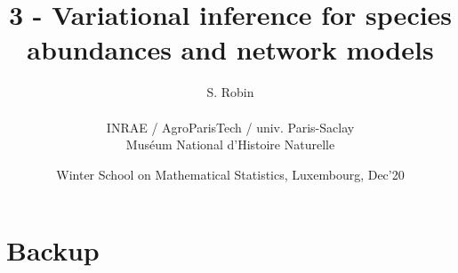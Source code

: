 \documentclass[8pt]{beamer}
\newcommand{\figlux}{./Figures}
\begin{document}
\title{3 - Variational inference for species abundances and network models}

\author[S. Robin]{S. Robin \\ ~\\
  {\small INRAE / AgroParisTech / univ. Paris-Saclay \\
  Mus\'eum National d'Histoire Naturelle}
  }

\date[Luxembourg, Dec'20]{Winter School on Mathematical Statistics, Luxembourg, Dec'20}

\maketitle











% 



\backupbegin 
\section*{Backup}



\backupend 

\end{document}
